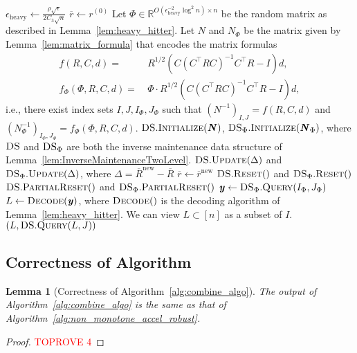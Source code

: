 \documentclass[11pt]{article}
\newtheorem{lemma}[theorem]{Lemma}
\newcommand{\new}{\mathrm{new}}
\newcommand\dd{\boldsymbol{\mathit{d}}}
\newcommand\rr{\boldsymbol{\mathit{r}}}
\newcommand\uu{\boldsymbol{\mathit{u}}}
\newcommand\yy{\boldsymbol{\mathit{y}}}
\newcommand\CC{\boldsymbol{\mathit{C}}}
\newcommand\II{\boldsymbol{\mathit{I}}}
\newcommand\NN{\boldsymbol{\mathit{N}}}
\newcommand\RR{\boldsymbol{\mathit{R}}}
\newcommand{\ov}{\overline}
\newcommand\R{\mathbb{R}}
\newcommand{\heavy}{\text{heavy}}
\begin{document}
\begin{algorithm}
\caption{Heavy hitter data structure $\textsc{DS}_{\textsc{HeavyHitters}}$ to compute the heavy entries of $\uu$}\label{alg:DS_Heavy_Hitters}
\begin{algorithmic}[1]
\State $\epsilon_{\heavy} \gets \frac{\rho \sqrt{\epsilon}}{2 C_3 \sqrt{n}}$
\State $\ov{\rr} \leftarrow \rr^{(0)}$
\State Let $\Phi \in \R^{O(\epsilon_{\heavy}^{-2} \log^2 n) \times n}$ be the random matrix as described in Lemma~\ref{lem:heavy_hitter}.
\State Let $\NN$ and $\NN_{\Phi}$ be the matrix given by Lemma~\ref{lem:matrix_formula} that encodes the matrix formulas
\begin{align*}
f(\RR, \CC, \dd) = &~ \RR^{1/2} (\CC (\CC^{\top} \RR \CC)^{-1} \CC^{\top} \RR - \II) \dd, \\
f_{\Phi}(\Phi, \RR, \CC, \dd) = &~ \Phi \cdot \RR^{1/2} (\CC (\CC^{\top} \RR \CC)^{-1} \CC^{\top} \RR - \II) \dd,
\end{align*}
i.e., there exist index sets $I,J, I_{\Phi}, J_{\Phi}$ such that $(\NN^{-1})_{I,J} = f(\RR, \CC, \dd)$ and $(\NN_{\Phi}^{-1})_{I_{\Phi},J_{\Phi}} = f_{\Phi}(\Phi, \RR, \CC, \dd)$.
\State $\textsc{DS}.\textsc{Initialize}(\NN)$, $\textsc{DS}_{\Phi}.\textsc{Initialize}(\NN_{\Phi})$, where $\textsc{DS}$ and $\textsc{DS}_{\Phi}$ are both the inverse maintenance data structure of Lemma~\ref{lem:InverseMaintenanceTwoLevel}.
\EndProcedure
\Procedure{UpdateQuery}{$\ov{\rr}^{\new}$}
\State $\textsc{DS}.\textsc{Update}(\Delta)$ and $\textsc{DS}_{\Phi}.\textsc{Update}(\Delta)$, where $\Delta = \ov{\RR}^{\new} - \ov{\RR}$
\State $\ov{\rr} \gets \ov{\rr}^{\new}$
\State $\textsc{DS}.\textsc{Reset}()$ and $\textsc{DS}_{\Phi}.\textsc{Reset}()$
\State $\textsc{DS}.\textsc{PartialReset}()$ and $\textsc{DS}_{\Phi}.\textsc{PartialReset}()$
\EndIf
\State $\yy \gets \textsc{DS}_{\Phi}.\textsc{Query}(I_{\Phi},J_{\Phi})$ \label{algline:DS_heavy_hitters_y}
\State $L \gets \textsc{Decode}(\yy)$, where $\textsc{Decode}()$ is the decoding algorithm of Lemma~\ref{lem:heavy_hitter}. We can view $L \subset [n]$ as a subset of $I$. \label{algline:DS_heavy_hitters_L}
\State \Return $(L, \textsc{DS}.\textsc{Query}(L, J))$ \label{algline:DS_heavy_hitters_return}
\EndProcedure
\end{algorithmic}
\end{algorithm}

\subsection{Correctness of Algorithm}
\begin{lemma}[Correctness of Algorithm~\ref{alg:combine_algo}]
The output of Algorithm~\ref{alg:combine_algo} is the same as that of Algorithm~\ref{alg:non_monotone_accel_robust}.
\end{lemma}
\begin{proof}\textcolor{red}{TOPROVE 4}\end{proof}
\end{document}
